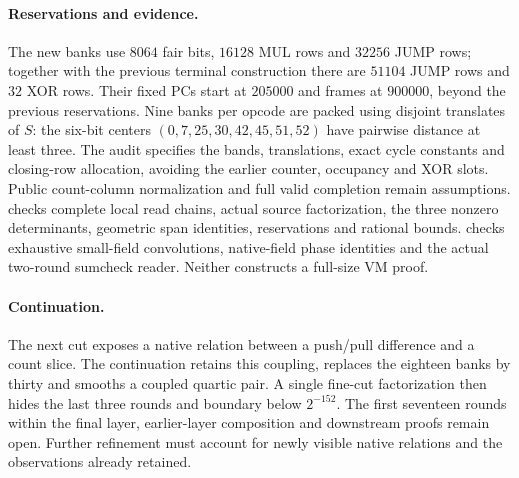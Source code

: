 \paragraph{Reservations and evidence.} The new banks use $8064$ fair bits, $16128$ MUL rows and $32256$ JUMP rows; together with the previous terminal construction there are $51104$ JUMP rows and $32$ XOR rows. Their fixed PCs start at $205000$ and frames at $900000$, beyond the previous reservations. Nine banks per opcode are packed using disjoint translates of $S$: the six-bit centers $(0,7,25,30,42,45,51,52)$ have pairwise distance at least three. The audit specifies the bands, translations, exact cycle constants and closing-row allocation, avoiding the earlier counter, occupancy and XOR slots. Public count-column normalization and full valid completion remain assumptions.  checks complete local read chains, actual source factorization, the three nonzero determinants, geometric span identities, reservations and rational bounds.  checks exhaustive small-field convolutions, native-field phase identities and the actual two-round sumcheck reader. Neither constructs a full-size VM proof.

\paragraph{Continuation.} The next cut exposes a native relation between a push/pull difference and a count slice. The continuation  retains this coupling, replaces the eighteen banks by thirty and smooths a coupled quartic pair. A single fine-cut factorization then hides the last three rounds and boundary below $2^{-152}$. The first seventeen rounds within the final layer, earlier-layer composition and downstream proofs remain open. Further refinement must account for newly visible native relations and the observations already retained.
